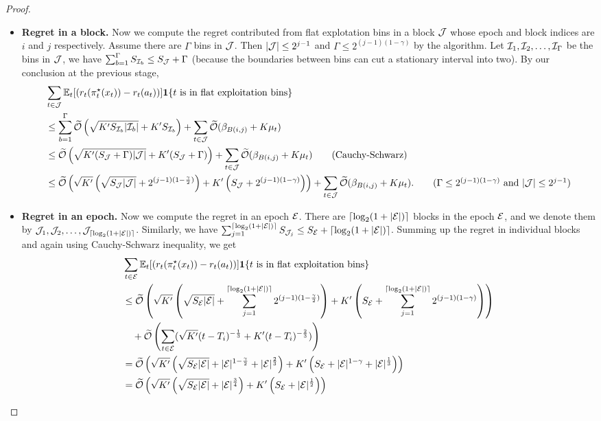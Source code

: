\begin{proof}
\begin{itemize}[leftmargin=*]
\item \textbf{Regret in a block.}
Now we compute the regret contributed from flat explotation bins in a block ${\mathcal{J}}$ whose epoch and block indices are $i$ and $j$ respectively. Assume there are $\Gamma$ bins in ${\mathcal{J}}$. Then $\lvert{\mathcal{J}}\rvert\leq 2^{j-1}$ and $\Gamma \leq 2^{(j-1)(1-\gamma)}$ by the algorithm. Let ${\mathcal{I}}_1, {\mathcal{I}}_2, \ldots, {\mathcal{I}}_\Gamma$ be the bins in ${\mathcal{J}}$, we have $\sum_{b=1}^{\Gamma}S_{{\mathcal{I}}_b}\leq  S_{{\mathcal{J}}} + \Gamma$ (because the boundaries between bins can cut a stationary interval into two). By our conclusion at the previous stage, 
\begin{align*}
&\sum_{t \in \calJ} \E_t[ (r_t(\pi^\star_t(x_t)) - r_t(a_t))]\one\{t \text{ is in flat exploitation bins}\}  \\
&\leq \sum_{b=1}^{\Gamma} \otil\left(\sqrt{K^\p S_{\calI_b}\abs{\calI_b}} + K^\p S_{\calI_b}\right) + \sum_{t\in\calJ} \otil(\beta_{B(i,j)}+K\mu_t) \\
&\leq \otil\left( \sqrt{K^\p (S_{\calJ} + \Gamma) \abs{\calJ} } + K^\p (S_{\calJ}+\Gamma)\right)+ \sum_{t\in\calJ} \otil(\beta_{B(i,j)}+K\mu_t) \tag{Cauchy-Schwarz}\\
& \leq \otil\left(\sqrt{K^\p}\left(\sqrt{S_{\calJ}\abs{\calJ}} + 2^{(j-1)(1-\frac{\gamma}{2})}\right) +K^\p\left(S_{\calJ}+2^{(j-1)(1-\gamma)}\right) \right) + \sum_{t\in\calJ} \otil(\beta_{B(i,j)}+K\mu_t). \tag{$\Gamma\leq 2^{(j-1)(1-\gamma)}$ and $\abs{\calJ}\leq 2^{j-1}$}
\end{align*}
\item \textbf{Regret in an epoch.}
Now we compute the regret in an epoch ${\mathcal{E}}$. There are $\lceil\log_2(1+\lvert{\mathcal{E}}\rvert)\rceil$ blocks in the epoch ${\mathcal{E}}$, and we denote them by ${\mathcal{J}}_1, {\mathcal{J}}_2, \ldots, {\mathcal{J}}_{\lceil\log_2(1+\lvert{\mathcal{E}}\rvert)\rceil}$. Similarly, we have $\sum_{j=1}^{\lceil\log_2(1+\lvert{\mathcal{E}}\rvert)\rceil} S_{{\mathcal{J}}_j} \leq S_{{\mathcal{E}}}+\lceil\log_2(1+\lvert{\mathcal{E}}\rvert)\rceil$. Summing up the regret in individual blocks and again using Cauchy-Schwarz inequality, we get
\begin{align*}
&\sum_{t \in {\mathcal{E}}} \mathbb{E}_t[ (r_t(\pi^\star_t(x_t)) - r_t(a_t))] \boldsymbol{1}\{t \text{ is in flat exploitation bins}\} \\
&\leq \widetilde{\mathcal{O}}\left( \sqrt{K^\prime} \left( \sqrt{S_{\mathcal{E}}\lvert{\mathcal{E}}\rvert}   + \sum_{j=1}^{\lceil\log_2(1+\lvert{\mathcal{E}}\rvert)\rceil} 2^{(j-1)(1-\frac{\gamma}{2})} \right) 
+ K^\prime \left( S_{\mathcal{E}} +  \sum_{j=1}^{\lceil\log_2(1+\lvert{\mathcal{E}}\rvert)\rceil}  2^{(j-1)(1-\gamma)} \right) \right)  \\
&\ \ \ +\widetilde{\mathcal{O}}\left(\sum_{t\in{\mathcal{E}}} (\sqrt{K^\prime}(t-T_i)^{-\frac{1}{3}} + K^\prime(t-T_i)^{-\frac{2}{3}}) \right)\\
&=\widetilde{\mathcal{O}}\left( \sqrt{K^\prime}\left(\sqrt{S_{\mathcal{E}}\lvert{\mathcal{E}}\rvert} + \lvert{\mathcal{E}}\rvert^{1-\frac{\gamma}{2}} + \lvert{\mathcal{E}}\rvert^{\frac{2}{3}}  \right) 
+ K^\prime\left(S_{\mathcal{E}}+ \lvert{\mathcal{E}}\rvert^{1-\gamma} + \lvert{\mathcal{E}}\rvert^{\frac{1}{3}} \right) \right)\\ 
&=\widetilde{\mathcal{O}}\left( \sqrt{K'}\left(\sqrt{S_{\mathcal{E}} \lvert{\mathcal{E}}\rvert} + \lvert{\mathcal{E}}\rvert^{\frac{3}{4}}\right) + K'\left(S_{\mathcal{E}} + \lvert{\mathcal{E}}\rvert^{\frac{1}{2}}\right)\right)
\end{align*}


\end{itemize}
\end{proof}
